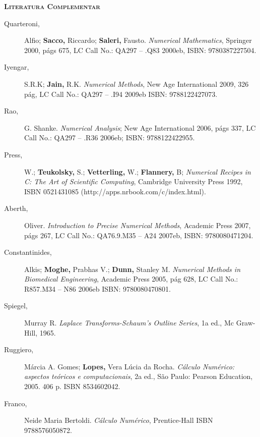 \textbf{\textsc{Literatura Complementar}}
\begin{description}

	\item [Quarteroni,] Alfio; \textbf{Sacco,} Riccardo; \textbf{Saleri,} Fausto. \textit{Numerical Mathematics}, Springer 2000, págs 675, LC Call No.: QA297 -- .Q83 2000eb, ISBN: 9780387227504.

	\item [Iyengar,] S.R.K; \textbf{Jain,} R.K. \textit{Numerical Methods}, New Age International 2009, 326 pág, LC Call No.: QA297 -- .I94 2009eb ISBN: 9788122427073.

	\item [Rao,] G. Shanke. \textit{Numerical Analysis}; New Age International 2006, págs 337, LC Call No.: QA297 -- .R36 2006eb; ISBN: 9788122422955.

	\item [Press,] W.; \textbf{Teukolsky,} S.; \textbf{Vetterling,} W.; \textbf{Flannery,} B; \textit{Numerical Recipes in C: The Art of Scientific Computing}, Cambridge University Press 1992, ISBN 0521431085 (http://apps.nrbook.com/c/index.html).

	\item [Aberth,] Oliver. \textit{Introduction to Precise Numerical Methods}, Academic Press 2007, págs 267, LC Call No.: QA76.9.M35 -- A24 2007eb, ISBN: 9780080471204.

	\item [Constantinides,] Alkis; \textbf{Moghe,} Prabhas V.; \textbf{Dunn,} Stanley M. \textit{Numerical Methods in Biomedical Engineering}, Academic Press 2005, pág 628, LC Call No.: R857.M34 -- N86 2006eb ISBN: 9780080470801.

	\item [Spiegel,] Murray R. \textit{Laplace Transforms-Schaum's Outline Series}, 1a ed., Mc Graw-Hill, 1965.

	\item [Ruggiero,] Márcia A. Gomes; \textbf{Lopes,} Vera Lúcia da Rocha. \textit{Cálculo Numérico: aspectos teóricos e computacionais}, 2a ed., São Paulo: Pearson Education, 2005. 406 p. ISBN 8534602042.

	\item [Franco,] Neide Maria Bertoldi. \textit{Cálculo Numérico}, Prentice-Hall ISBN 9788576050872.

\end{description}
